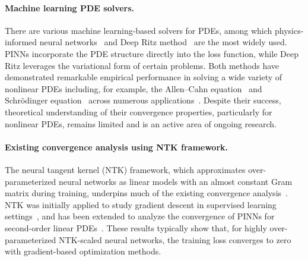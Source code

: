 \documentclass{article}
\begin{document}
\paragraph{Machine learning PDE solvers.}  
There are various machine learning-based solvers for PDEs, among which physics-informed neural networks~\citep{raissi2019physics} and Deep Ritz method~\citep{weinan2018deep} are the most widely used. 
PINNs incorporate the PDE structure directly into the loss function, while Deep Ritz leverages the variational form of certain problems. 
Both methods have demonstrated remarkable empirical performance in solving a wide variety of nonlinear PDEs including, for example, the Allen--Cahn equation~\citep{wight2021solving} and  Schr{\"o}dinger equation~\citep{qiu2025data} across numerous applications~\citep{chen2024analysis, tang2023physics,  savovic2023comparative}. 
Despite their success, theoretical understanding of their convergence properties, particularly for nonlinear PDEs, remains limited and is an active area of ongoing research.
\vspace{-8pt}
\paragraph{Existing convergence analysis using NTK framework.}  
The neural tangent kernel (NTK) framework, which approximates over-parameterized neural networks as linear models with an almost constant Gram matrix during training, underpins much of the existing convergence analysis~\citep{NTK,li2020learning}. 
NTK was initially applied to study gradient descent in supervised learning settings~\citep{gd_cong2, luo2024two,du2018gradient}, and has been extended to analyze the convergence of PINNs for second-order linear PDEs~\citep{GD_cong_PINN,xu2024convergence,xu2024convergence1}. %
These results typically show that, for highly over-parameterized NTK-scaled neural networks, the training loss converges to zero with gradient-based optimization methods. 
\vspace{-8pt}
\end{document}

